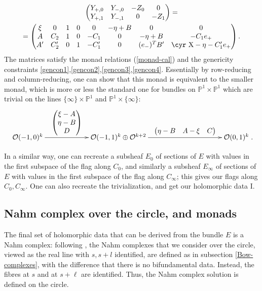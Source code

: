 \documentclass[12pt]{article}
\theoremstyle{definition}
\theoremstyle{remark}
\numberwithin{theorem}{section}
\newcommand{\Sh}{\hbox{\cyr X}}
\def\bP{{\mathbb {P}}}
\def\pO{{\mathcal O}}
\begin{document}
\begin{multline*}
\begin{pmatrix}Y_{+,0}&Y_{-,0}&-Z_0&0\\Y_{+,1}&Y_{-,1}&0&-Z_1\end{pmatrix}=\\
= \begin{pmatrix}\xi&0&1&0&0& -\eta+B&0&0\\ A&C_2 &1&0&-C_1&0& -\eta+B&-C_1e_+\\
 A'&C'_2&0&1&-C'_1& 0& (e_-)^TB'&\Sh-\eta -C'_1e_+\end{pmatrix}.\end{multline*}
 The matrices satisfy the monad relations (\ref{monad-cal}) and the genericity constraints \eqref{gencon1},\eqref{gencon2},\eqref{gencon3},\eqref{gencon4}.
 Essentially by row-reducing and column-reducing, one can show that this monad is equivalent to the smaller monad, which is more or less the standard one for bundles on $\bP^1\times\bP^1$ which are trivial on the lines $\{\infty\}\times\bP^1$ and $\bP^1\times \{\infty\}:$
 $$\xymatrix{ \pO(-1,0)^k\ar[rr]^-{\begin{pmatrix} \xi - A\\ \eta -B\\ D\end{pmatrix}}&{\phantom{A}}&\pO(-1,1)^{k}\oplus \pO^{k+2}\ar[rr]^-{\begin{pmatrix} \eta-B& A-\xi&C \end{pmatrix}}&{\phantom{\eta-B A-\xi }} %
 &\pO(0,1)^k}.$$
  
 In a similar way, one can recreate a subsheaf $E_0$ of sections of $E$ with values in the first subspace of the flag along $C_0$, and similarly a subsheaf $E_\infty$ of sections of $E$ with values in the first subspace of the flag along $C_\infty$; this gives our flags along $C_0, C_\infty$.  One can also recreate the trivialization, and get our holomorphic data I. 
 
 
 \subsection {Nahm complex over the circle, and monads}
 
  The final set of holomorphic data that can be derived from the bundle $E$ is a Nahm complex: following \cite{Charbonneau:2006gu},  the Nahm complexes that we  consider over the circle, viewed as the real line with $s, s+l$ identified, are defined as in subsection \ref{Bow-complexes}, 
with the difference that there is no bifundamental data.  Instead, the fibres at $s$ and at $s+\ell$ are identified.  Thus, the Nahm complex solution is defined on the circle.
\end{document}
